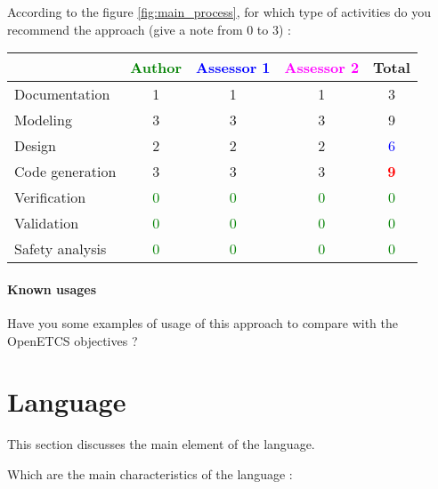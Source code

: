 According to the figure \ref{fig:main_process}, for which type of activities do you recommend the approach (give a note from 0 to  3) :

\begin{tabular}{|l | c | c | c | c|}
\hline
& \textcolor{green}{Author} & \textcolor{blue}{Assessor 1} & \textcolor{magenta}{Assessor 2} & Total \\
\hline 
Documentation &1 &1 & 1    & 3    \\
\hline
Modeling &3 &3 & 3   &  9 \\
\hline
Design &2 &2 & 2    & \textcolor{blue}{6} \\
\hline
Code generation &3 &3 & 3   & \textcolor{red}{\textbf{9}} \\
\hline
Verification & \textcolor{green}{0}   & \textcolor{green}{0}   & \textcolor{green}{0} & \textcolor{green}{0} \\
\hline
Validation & \textcolor{green}{0}   & \textcolor{green}{0}   & \textcolor{green}{0} & \textcolor{green}{0} \\
\hline
Safety analysis & \textcolor{green}{0}   & \textcolor{green}{0}   & \textcolor{green}{0} & \textcolor{green}{0} \\
\hline
\end{tabular}

\paragraph{Known usages} Have you some examples of usage of this approach to  compare with the OpenETCS objectives ?

\section{Language}
This section discusses the main element of the language.

Which are the main characteristics of the language :

